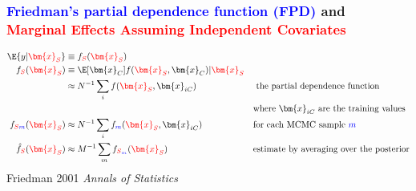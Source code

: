 \documentclass[11pt,dvipsnames,usenames,times]{beamer}
\begin{document}
\begin{frame}[fragile]\frametitle{\bf\textcolor{blue}{Friedman's partial dependence function (FPD)} and\\
\textcolor{red}{Marginal Effects Assuming Independent Covariates}}

\begin{comment}
Suppose that we have a complex regression function, $f(\textcolor{red}{\bm{x}_S}, {\bm{x}_{C}})$, %
where $\textcolor{red}{\bm{x}_S} $ is a covariate subset of interest (at a fixed setting) and\\
 ${\bm{x}_{C}} $ are the complementary covariates 
\end{comment}
\begin{align*}
\E{y|\textcolor{red}{\bm{x}_S}} & \equiv f_{\textcolor{red}{S}}(\textcolor{red}{\bm{x}_S}) & & \\
f_{\textcolor{red}{S}}(\textcolor{red}{\bm{x}_S})&
\equiv \E[{\bm{x}_C}]{f(\textcolor{red}{\bm{x}_S}, {\bm{x}_{C}})|\textcolor{red}{\bm{x}_S} } & \\
& \approx N^{-1} \sum_i f(\textcolor{red}{\bm{x}_S}, {\bm{x}_{iC}}) & &
 \mbox{ the partial dependence function} \\
& & & \mbox{where $\bm{x}_{iC}$ are the training values} \\
f_{\textcolor{red}{S}\textcolor{blue}{m}}(\textcolor{red}{\bm{x}_S}) &
 \approx N^{-1} \sum_i f_{\textcolor{blue}{m}}(\textcolor{red}{\bm{x}_S}, 
{\bm{x}_{iC}}) & & \mbox{for each MCMC sample\ } \textcolor{blue}{m} \\
\hat{f}_{\textcolor{red}{S}}(\textcolor{red}{\bm{x}_S}) &
 \approx M^{-1} \sum_m f_{\textcolor{red}{S}_{\textcolor{blue}{m}}}(\textcolor{red}{\bm{x}_S}) & & \mbox{estimate by averaging over the posterior}
\end{align*}
Friedman 2001 {\it Annals of Statistics} 

\end{frame}
\end{document}
